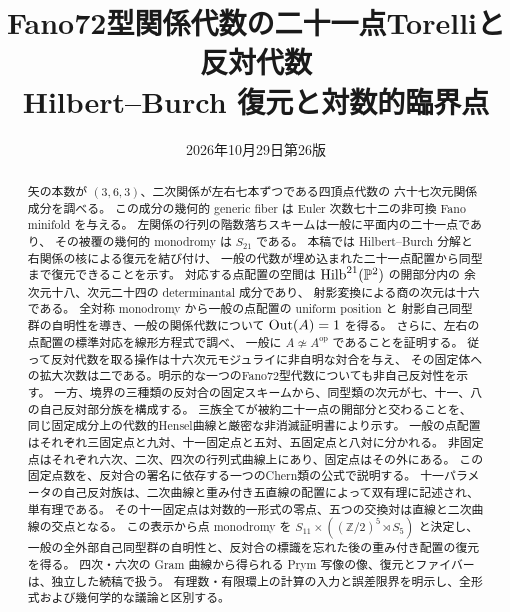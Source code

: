 
\title{Fano72型関係代数の二十一点Torelliと反対代数\\[.4em]
\large Hilbert--Burch 復元と対数的臨界点}
\author{}\date{2026年10月29日\quad 第26版}

\maketitle
\begin{abstract}
矢の本数が $(3,6,3)$、二次関係が左右七本ずつである四頂点代数の
六十七次元関係成分を調べる。
この成分の幾何的 generic fiber は Euler 次数七十二の非可換 Fano minifold を与える。
左関係の行列の階数落ちスキームは一般に平面内の二十一点であり、
その被覆の幾何的 monodromy は $S_{21}$ である。
本稿では Hilbert--Burch 分解と右関係の核による復元を結び付け、
一般の代数が埋め込まれた二十一点配置から同型まで復元できることを示す。
対応する点配置の空間は $\operatorname{Hilb}^{21}(\mathbb P^2)$ の開部分内の
余次元十八、次元二十四の determinantal 成分であり、
射影変換による商の次元は十六である。
全対称 monodromy から一般の点配置の uniform position と
射影自己同型群の自明性を導き、一般の関係代数について $\operatorname{Out}(A)=1$ を得る。
さらに、左右の点配置の標準対応を線形方程式で調べ、
一般に $A\not\simeq A^{\mathrm{op}}$ であることを証明する。
従って反対代数を取る操作は十六次元モジュライに非自明な対合を与え、
その固定体への拡大次数は二である。明示的な一つのFano72型代数についても非自己反対性を示す。
一方、境界の三種類の反対合の固定スキームから、同型類の次元が七、十一、八の自己反対部分族を構成する。
三族全てが被約二十一点の開部分と交わることを、
同じ固定成分上の代数的Hensel曲線と厳密な非消滅証明書により示す。
一般の点配置はそれぞれ三固定点と九対、十一固定点と五対、五固定点と八対に分かれる。
非固定点はそれぞれ六次、二次、四次の行列式曲線上にあり、固定点はその外にある。
この固定点数を、反対合の署名に依存する一つのChern類の公式で説明する。
十一パラメータの自己反対族は、二次曲線と重み付き五直線の配置によって双有理に記述され、単有理である。
その十一固定点は対数的一形式の零点、五つの交換対は直線と二次曲線の交点となる。
この表示から点 monodromy を $S_{11}\times((\mathbb Z/2)^5\rtimes S_5)$ と決定し、
一般の全外部自己同型群の自明性と、反対合の標識を忘れた後の重み付き配置の復元を得る。
四次・六次の Gram 曲線から得られる Prym 写像の像、復元とファイバーは、独立した続稿で扱う。
有理数・有限環上の計算の入力と誤差限界を明示し、全形式および幾何学的な議論と区別する。
\end{abstract}
\begingroup\small\setlength{\parskip}{0pt}\tableofcontents\endgroup


